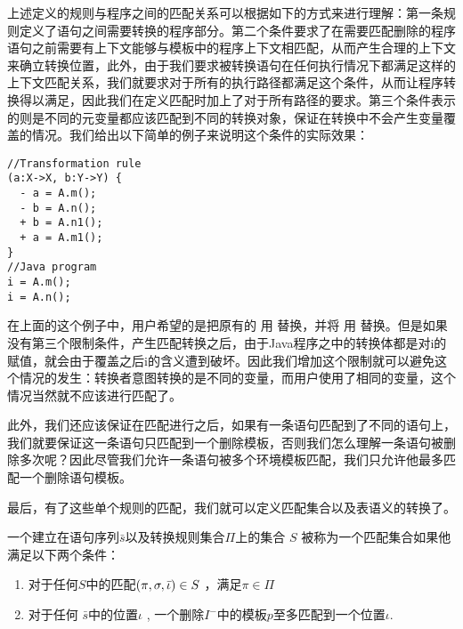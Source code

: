 上述定义的规则与程序之间的匹配关系可以根据如下的方式来进行理解：第一条规则定义了语句之间需要转换的程序部分。第二个条件要求了在需要匹配删除的程序语句之前需要有上下文能够与模板中的程序上下文相匹配，从而产生合理的上下文来确立转换位置，此外，由于我们要求被转换语句在任何执行情况下都满足这样的上下文匹配关系，我们就要求对于所有的执行路径都满足这个条件，从而让程序转换得以满足，因此我们在定义匹配时加上了对于所有路径的要求。第三个条件表示的则是不同的元变量都应该匹配到不同的转换对象，保证在转换中不会产生变量覆盖的情况。我们给出以下简单的例子来说明这个条件的实际效果：

\begin{center}
\begin{smpage}{0.5\columnwidth}
\begin{lstlisting}[style=patl,frame=none]
//Transformation rule
(a:X->X, b:Y->Y) {
  - a = A.m();
  - b = A.n();
  + b = A.n1();
  + a = A.m1(); 
}
//Java program
i = A.m();
i = A.n();
\end{lstlisting}
\end{smpage}
\end{center}

在上面的这个例子中，用户希望的是把原有的  用  替换，并将  用  替换。但是如果没有第三个限制条件，产生匹配转换之后，由于Java程序之中的转换体都是对i的赋值，就会由于覆盖之后i的含义遭到破坏。因此我们增加这个限制就可以避免这个情况的发生：转换者意图转换的是不同的变量，而用户使用了相同的变量，这个情况当然就不应该进行匹配了。

此外，我们还应该保证在匹配进行之后，如果有一条语句匹配到了不同的语句上，我们就要保证这一条语句只匹配到一个删除模板，否则我们怎么理解一条语句被删除多次呢？因此尽管我们允许一条语句被多个环境模板匹配，我们只允许他最多匹配一个删除语句模板。

最后，有了这些单个规则的匹配，我们就可以定义匹配集合以及表语义的转换了。

\begin{definition}[匹配集合]
  一个建立在语句序列$\bar{s}$以及转换规则集合$\Pi$上的集合 $S$ 被称为一个匹配集合如果他满足以下两个条件：
\begin{enumerate}
\item 对于任何$S$中的匹配$(\pi, \sigma, \bar{\iota}) \in S$ ，满足$\pi \in \Pi$
  
\item 对于任何 $\bar{s}$中的位置$\iota$ , 一个删除$I^-$中的模板$p$至多匹配到一个位置$\iota$.
\end{enumerate}
\end{definition}


